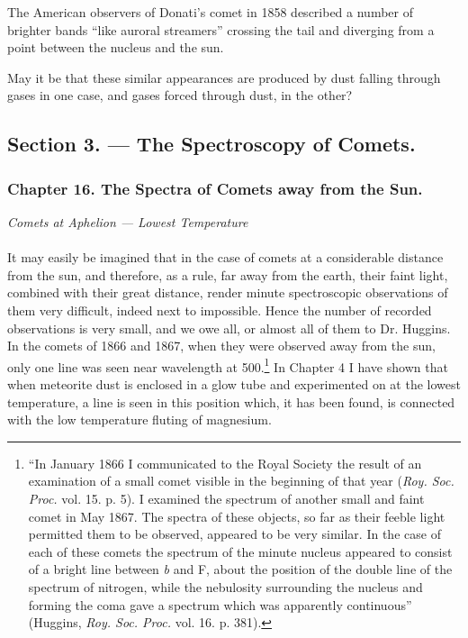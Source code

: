 \documentclass[a4paper, 12pt, oneside, polutonikogreek, english]{article}
\begin{document}
The American observers of Donati's comet in 1858 described a number of brighter bands ``like auroral streamers'' crossing the tail and diverging from a point between the nucleus and the sun.

May it be that these similar appearances are produced by dust falling through gases in one case, and gases forced through dust, in the other?
\clearpage
\subsection{Section 3. --- The Spectroscopy of Comets.}
\subsubsection{Chapter 16. The Spectra of Comets away from the Sun.}
\begin{center}
\emph{Comets at Aphelion --- Lowest Temperature}
\end{center}
\paragraph{}
It may easily be imagined that in the case of comets at a considerable distance from the sun, and therefore, as a rule, far away from the earth, their faint light, combined with their great distance, render minute spectroscopic observations of them very difficult, indeed next to impossible. Hence the number of recorded observations is very small, and we owe all, or almost all of them to Dr. Huggins. In the comets of 1866 and 1867, when they were observed away from the sun, only one line was seen near wavelength at 500.\footnote{``In January 1866 I communicated to the Royal Society the result of an examination of a small comet visible in the beginning of that year (\emph{Roy. Soc. Proc.} vol. 15. p. 5). I examined the spectrum of another small and faint comet in May 1867. The spectra of these objects, so far as their feeble light permitted them to be observed, appeared to be very similar. In the case of each of these comets the spectrum of the minute nucleus appeared to consist of a bright line between \emph{b} and F, about the position of the double line of the spectrum of nitrogen, while the nebulosity surrounding the nucleus and forming the coma gave a spectrum which was apparently continuous'' (Huggins, \emph{Roy. Soc. Proc.} vol. 16. p. 381).} In Chapter 4 I have shown that when meteorite dust is enclosed in a glow tube and experimented on at the lowest temperature, a line is seen in this position which, it has been found, is connected with the low temperature fluting of magnesium.
\end{document}
